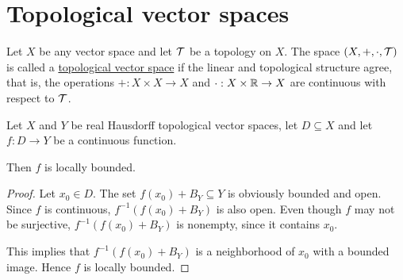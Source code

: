 \section{Topological vector spaces}\label{sec:topological_vector_spaces}

\begin{definition}\label{def:topological_vector_space}
  Let $X$ be any vector space and let $\mathcal T$ be a topology on $X$. The space $(X, +, \cdot, \mathcal T)$ is called a \uline{topological vector space} if the linear and topological structure agree, that is, the operations $+: X \times X \to X$ and $\cdot: X \times \mathbb R \to X$ are continuous with respect to $\mathcal T$.
\end{definition}

\begin{proposition}\label{thm:continuous_implies_locally_bounded}
  Let $X$ and $Y$ be real Hausdorff topological vector spaces, let $D \subseteq X$ and let $f: D \to Y$ be a continuous function.

  Then $f$ is locally bounded.
\end{proposition}
\begin{proof}
  Let $x_0 \in D$. The set $f(x_0) + B_Y \subseteq Y$ is obviously bounded and open. Since $f$ is continuous, $f^{-1}(f(x_0) + B_Y)$ is also open. Even though $f$ may not be surjective, $f^{-1}(f(x_0) + B_Y)$ is nonempty, since it contains $x_0$.

  This implies that $f^{-1}(f(x_0) + B_Y)$ is a neighborhood of $x_0$ with a bounded image. Hence $f$ is locally bounded.
\end{proof}
